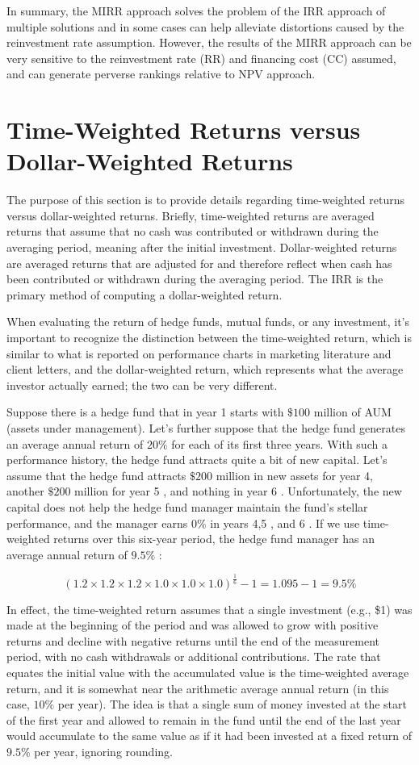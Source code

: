 \documentclass[11pt]{article}
\begin{document}
In summary, the MIRR approach solves the problem of the IRR approach of multiple solutions and in some cases can help alleviate distortions caused by the reinvestment rate assumption. However, the results of the MIRR approach can be very sensitive to the reinvestment rate (RR) and financing cost (CC) assumed, and can generate perverse rankings relative to NPV approach.

\section*{Time-Weighted Returns versus Dollar-Weighted Returns}
The purpose of this section is to provide details regarding time-weighted returns versus dollar-weighted returns. Briefly, time-weighted returns are averaged returns that assume that no cash was contributed or withdrawn during the averaging period, meaning after the initial investment. Dollar-weighted returns are averaged returns that are adjusted for and therefore reflect when cash has been contributed or withdrawn during the averaging period. The IRR is the primary method of computing a dollar-weighted return.

When evaluating the return of hedge funds, mutual funds, or any investment, it's important to recognize the distinction between the time-weighted return, which is similar to what is reported on performance charts in marketing literature and client letters, and the dollar-weighted return, which represents what the average investor actually earned; the two can be very different.

Suppose there is a hedge fund that in year 1 starts with $\$ 100$ million of AUM (assets under management). Let's further suppose that the hedge fund generates an average annual return of $20 \%$ for each of its first three years. With such a performance history, the hedge fund attracts quite a bit of new capital. Let's assume that the hedge fund attracts $\$ 200$ million in new assets for year 4, another $\$ 200$ million for year 5 , and nothing in year 6 . Unfortunately, the new capital does not help the hedge fund manager maintain the fund's stellar performance, and the manager earns $0 \%$ in years 4,5 , and 6 . If we use time-weighted returns over this six-year period, the hedge fund manager has an average annual return of $9.5 \%$ :

$$
(1.2 \times 1.2 \times 1.2 \times 1.0 \times 1.0 \times 1.0)^{\frac{1}{6}}-1=1.095-1=9.5 \%
$$

In effect, the time-weighted return assumes that a single investment (e.g., \$1) was made at the beginning of the period and was allowed to grow with positive returns and decline with negative returns until the end of the measurement period, with no cash withdrawals or additional contributions. The rate that equates the initial value with the accumulated value is the time-weighted average return, and it is somewhat near the arithmetic average annual return (in this case, $10 \%$ per year). The idea is that a single sum of money invested at the start of the first year and allowed to remain in the fund until the end of the last year would accumulate to the same value as if it had been invested at a fixed return of $9.5 \%$ per year, ignoring rounding.
\end{document}

